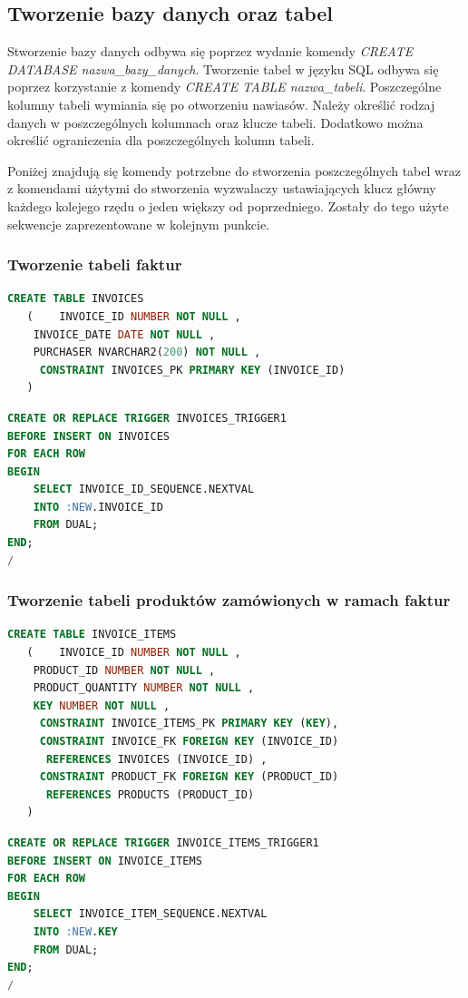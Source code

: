 \documentclass{article}
\begin{document}
\subsection{Tworzenie bazy danych oraz tabel}
Stworzenie bazy danych odbywa się poprzez wydanie komendy \textit{CREATE
   DATABASE nazwa\_bazy\_danych}. Tworzenie tabel w języku SQL odbywa się poprzez korzystanie z komendy
\textit{CREATE TABLE nazwa\_tabeli}. Poszczególne kolumny tabeli wymiania się po
otworzeniu nawiasów. Należy określić rodzaj danych w poszczególnych kolumnach
oraz klucze tabeli. Dodatkowo można określić ograniczenia dla poszczególnych
kolumn tabeli.

Poniżej znajdują się komendy potrzebne do stworzenia poszczególnych tabel
wraz z komendami użytymi do stworzenia wyzwalaczy ustawiających klucz
główny każdego kolejego rzędu o jeden większy od poprzedniego. Zostały do
tego użyte sekwencje zaprezentowane w kolejnym punkcie.
\subsubsection{Tworzenie tabeli faktur}
\begin{lstlisting}[language=SQL,frame=single]
  CREATE TABLE INVOICES 
   (	INVOICE_ID NUMBER NOT NULL , 
	INVOICE_DATE DATE NOT NULL , 
	PURCHASER NVARCHAR2(200) NOT NULL , 
	 CONSTRAINT INVOICES_PK PRIMARY KEY (INVOICE_ID)
   ) 
\end{lstlisting}
\begin{lstlisting}[language=SQL,frame=single]
  CREATE OR REPLACE TRIGGER INVOICES_TRIGGER1 
BEFORE INSERT ON INVOICES
FOR EACH ROW
BEGIN
	SELECT INVOICE_ID_SEQUENCE.NEXTVAL
	INTO :NEW.INVOICE_ID
	FROM DUAL;
END;
/
\end{lstlisting}

\subsubsection{Tworzenie tabeli produktów zamówionych w ramach faktur}
\begin{lstlisting}[language=SQL,frame=single]
  CREATE TABLE INVOICE_ITEMS 
   (	INVOICE_ID NUMBER NOT NULL , 
	PRODUCT_ID NUMBER NOT NULL , 
	PRODUCT_QUANTITY NUMBER NOT NULL , 
	KEY NUMBER NOT NULL , 
	 CONSTRAINT INVOICE_ITEMS_PK PRIMARY KEY (KEY),
	 CONSTRAINT INVOICE_FK FOREIGN KEY (INVOICE_ID)
	  REFERENCES INVOICES (INVOICE_ID) , 
	 CONSTRAINT PRODUCT_FK FOREIGN KEY (PRODUCT_ID)
	  REFERENCES PRODUCTS (PRODUCT_ID) 
   )
\end{lstlisting}
\newpage
\begin{lstlisting}[language=SQL,frame=single]
  CREATE OR REPLACE TRIGGER INVOICE_ITEMS_TRIGGER1 
BEFORE INSERT ON INVOICE_ITEMS
FOR EACH ROW
BEGIN
	SELECT INVOICE_ITEM_SEQUENCE.NEXTVAL
	INTO :NEW.KEY
	FROM DUAL;
END;
/
\end{lstlisting}
\end{document}
